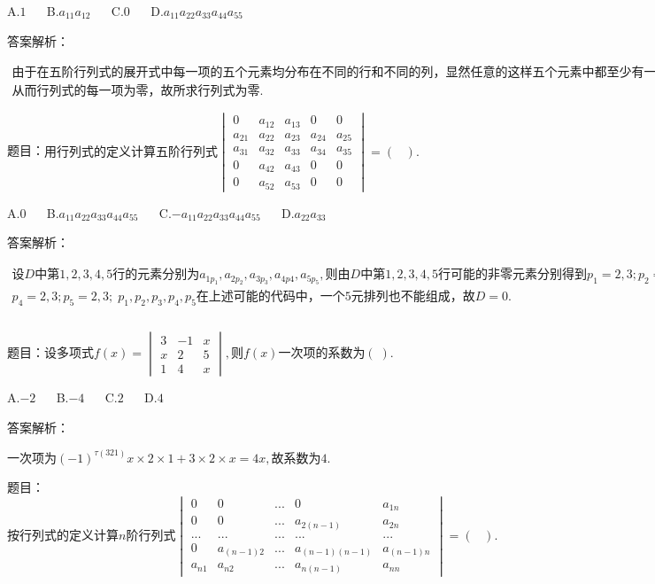 A.$1$ $\quad$ B.$a_{11}a_{12}$ $\quad$ C.$0$ $\quad$ D.$a_{11}a_{22}a_{33}a_{44}a_{55}$

答案解析：

$\begin{array}{l}\mathrm{由于在五阶行列式的展开式中每一项的五个元素均分布在不同的行和不同的列}，\mathrm{显然任意的这样五个元素中都至少有一个为零}\\\mathrm{从而行列式的每一项为零}，\mathrm{故所求行列式为零}.\end{array}$



题目：$\mathrm{用行列式的定义计算五阶行列式}\begin{vmatrix}0&a_{12}&a_{13}&0&0\\a_{21}&a_{22}&a_{23}&a_{24}&a_{25}\\a_{31}&a_{32}&a_{33}&a_{34}&a_{35}\\0&a_{42}&a_{43}&0&0\\0&a_{52}&a_{53}&0&0\end{vmatrix}=(\;\;\;).$

A.$0$ $\quad$ B.$a_{11}a_{22}a_{33}a_{44}a_{55}$ $\quad$ C.$-a_{11}a_{22}a_{33}a_{44}a_{55}$ $\quad$ D.$a_{22}a_{33}$

答案解析：

$\begin{array}{l}设D\mathrm{中第}1,2,3,4,5\mathrm{行的元素分别为}a_{1p_1},a_{2p_2},a_{3p_3},a_{4p4},a_{5p_5},\mathrm{则由}D\mathrm{中第}1,2,3,4,5\mathrm{行可能的非零元素分别得到}p_1=2,3;p_2=1,2,3,4,5;p_3=1,2,3,4,5\\p_4=2,3;p_5=2,3;\;p_1,p_2,p_3,p_4,p_5\mathrm{在上述可能的代码中}，\mathrm{一个}5\mathrm{元排列也不能组成}，故D=0.\\\\\end{array}$



题目：$\mathrm{设多项式}f(x)=\begin{vmatrix}3&-1&x\\x&2&5\\1&4&x\end{vmatrix},则f(x)\mathrm{一次项的系数为}(\;).$

A.$-2$ $\quad$ B.$-4$ $\quad$ C.$2$ $\quad$ D.$4$

答案解析：

$\mathrm{一次项为}(-1)^{\tau(321)}x\times2\times1+3\times2\times x=4x,\mathrm{故系数为}4.$



题目：$\mathrm{按行列式的定义计算}n\mathrm{阶行列式}\begin{vmatrix}0&0&...&0&a_{1n}\\0&0&...&a_{2(n-1)}&a_{2n}\\...&...&...&...&...\\0&a_{(n-1)2}&...&a_{(n-1)(n-1)}&a_{(n-1)n}\\a_{n1}&a_{n2}&...&a_{n(n-1)}&a_{nn}\end{vmatrix}=(\;\;\;).$

